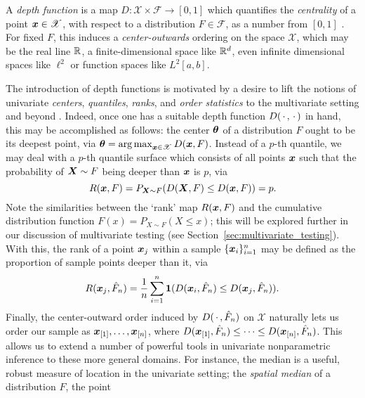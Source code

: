 

A \emph{depth function} is a map $D\colon \mathscr{X} \times \mathscr{F} \to
[0, 1]$ which quantifies the \emph{centrality} of a point $\bm{x} \in
\mathscr{X}$, with respect to a distribution $F \in \mathscr{F}$, as a number
from $[0, 1]$ \parencite{zuo-serfling-2000, mosler-mozharovskyi-2022,
liu-parelius-singh-1999, gijbels-nagy-2017}.
For fixed $F$, this induces a \emph{center-outwards} ordering on the space
$\mathscr{X}$, which may be the real line $\mathbb{R}$, a finite-dimensional space
like $\mathbb{R}^d$, even infinite dimensional spaces like $\ell^2$ or function spaces
like $L^2[a, b]$.


The introduction of depth functions is motivated by a desire to lift the
notions of univariate \emph{centers}, \emph{quantiles}, \emph{ranks}, and
\emph{order statistics} to the multivariate setting and beyond
\parencite{zuo-serfling-2000, mosler-mozharovskyi-2022}.
Indeed, once one has a suitable depth function $D(\,\cdot\,, \,\cdot\,)$ in hand, this
may be accomplished as follows: the center $\bm{\theta}$ of a distribution $F$ ought
to be its deepest point, via $\bm{\theta} = \operatorname*{arg\,max}_{\bm{x} \in \mathscr{X}} D(\bm{x}, F)$.
Instead of a $p$-th quantile, we may deal with a $p$-th quantile surface which
consists of all points $\bm{x}$ such that the probability of $\bm{X} \sim F$ being
deeper than $\bm{x}$ is $p$, via
\begin{equation}
    R(\bm{x}, F) = P_{\bm{X} \sim F}(D(\bm{X}, F) \leq D(\bm{x}, F)) = p.
\end{equation}
Note the similarities between the `rank' map $R(\bm{x}, F)$ and the cumulative
distribution function $F(x) = P_{X \sim F}(X \leq x)$; this will be explored
further in our discussion of multivariate testing (see
Section~\ref{sec:multivariate_testing}).
With this, the rank of a point $\bm{x}_j$ within a sample $\{\bm{x}_i\}_{i = 1}^n$
may be defined as the proportion of sample points deeper than it, via
\begin{equation}
    R(\bm{x}_j, \hat{F}_n) = \frac{1}{n}\sum_{i = 1}^n \bm{1}(D(\bm{x}_i, \hat{F}_n) \leq D(\bm{x}_j, \hat{F}_n)).
\end{equation}
Finally, the center-outward order induced by $D(\,\cdot\,, \hat{F}_n)$ on
$\mathscr{X}$ naturally lets us order our sample as $\bm{x}_{[1]}, \dots,
\bm{x}_{[n]}$, where $D(\bm{x}_{[1]}, \hat{F}_n) \leq \dots \leq D(\bm{x}_{[n]},
\hat{F}_n)$.
This allows us to extend a number of powerful tools in univariate
nonparametric inference to these more general domains.
For instance, the median is a useful, robust measure of location in the
univariate setting; the \emph{spatial median} of a distribution $F$, the point
